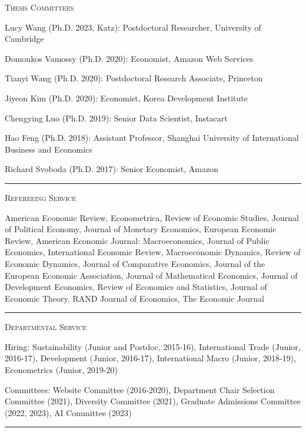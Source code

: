 \documentclass{article}
\begin{document}
\parbox{\textwidth}{
\parbox[t]{0.28\textwidth}{ \raggedright \noindent \textsc{ Thesis Committees } }
\parbox[t]{0.72\textwidth}{ \raggedright

Lucy Wang (Ph.D. 2023, Katz): Postdoctoral Researcher, University of Cambridge
\vspace{0.27cm}

Domonkos Vamossy (Ph.D. 2020): Economist, Amazon Web Services
\vspace{0.27cm}

Tianyi Wang (Ph.D. 2020): Postdoctoral Research Associate, Princeton
\vspace{0.27cm}

Jiyeon Kim (Ph.D. 2020): Economist, Korea Development Institute
\vspace{0.27cm}

Chengying Luo (Ph.D. 2019): Senior Data Scientist, Instacart
\vspace{0.27cm}

Hao Feng (Ph.D. 2018): Assistant Professor, Shanghai University of International Business and Economics
\vspace{0.27cm}

Richard Svoboda (Ph.D. 2017): Senior Economist, Amazon
\vspace{0.27cm}

}
\textcolor{light-gray}{\hrule}
}
\vspace{0.3cm}

\parbox{\textwidth}{
\parbox[t]{0.28\textwidth}{ \raggedright \noindent \textsc{ Refereeing Service } }
\parbox[t]{0.72\textwidth}{ \raggedright

American Economic Review, Econometrica, Review of Economic Studies, Journal of Political Economy, Journal of Monetary Economics, European Economic Review, American Economic Journal: Macroeconomics, Journal of Public Economics, International Economic Review, Macroeconomic Dynamics, Review of Economic Dynamics, Journal of Comparative Economics, Journal of the European Economic Association, Journal of Mathematical Economics, Journal of Development Economics, Review of Economics and Statistics, Journal of Economic Theory, RAND Journal of Economics, The Economic Journal
\vspace{0.27cm}

}
\textcolor{light-gray}{\hrule}
}
\vspace{0.3cm}

\parbox{\textwidth}{
\parbox[t]{0.28\textwidth}{ \raggedright \noindent \textsc{ Departmental Service } }
\parbox[t]{0.72\textwidth}{ \raggedright

Hiring: Sustainability (Junior and Postdoc, 2015-16), International Trade (Junior, 2016-17), Development (Junior, 2016-17), International Macro (Junior, 2018-19), Econometrics (Junior, 2019-20)
\vspace{0.27cm}

Committees: Website Committee (2016-2020), Department Chair Selection Committee (2021), Diversity Committee (2021), Graduate Admissions Committee (2022, 2023), AI Committee (2023)
\vspace{0.27cm}

}
\textcolor{light-gray}{\hrule}
}
\vspace{0.3cm}
\end{document}
